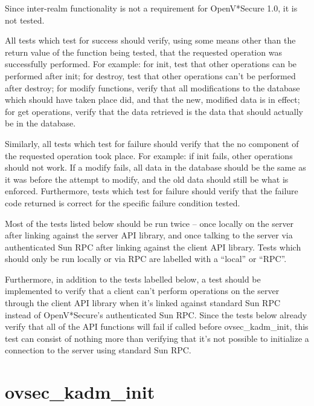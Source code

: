 Since inter-realm functionality is not a requirement for OpenV*Secure
1.0, it is not tested.

All tests which test for success should verify, using some means other
than the return value of the function being tested, that the requested
operation was successfully performed.  For example: for init, test
that other operations can be performed after init; for destroy, test
that other operations can't be performed after destroy; for modify
functions, verify that all modifications to the database which should
have taken place did, and that the new, modified data is in effect;
for get operations, verify that the data retrieved is the data that
should actually be in the database.

Similarly, all tests which test for failure should verify that the
no component of the requested operation took place.  For example: if
init fails, other operations should not work.  If a modify fails, all
data in the database should be the same as it was before the attempt
to modify, and the old data should still be what is enforced.
Furthermore, tests which test for failure should verify that the
failure code returned is correct for the specific failure condition
tested.

Most of the tests listed below should be run twice -- once locally on
the server after linking against the server API library, and once
talking to the server via authenticated Sun RPC after linking against
the client API library.  Tests which should only be run locally or via
RPC are labelled with a ``local'' or ``RPC''.

Furthermore, in addition to the tests labelled below, a test should be
implemented to verify that a client can't perform operations on the
server through the client API library when it's linked against
standard Sun RPC instead of OpenV*Secure's authenticated Sun RPC.
Since the tests below already verify that all of the API functions
will fail if called before ovsec_kadm_init, this test can consist of
nothing more than verifying that it's not possible to initialize a
connection to the server using standard Sun RPC.

\section{ovsec_kadm_init}



